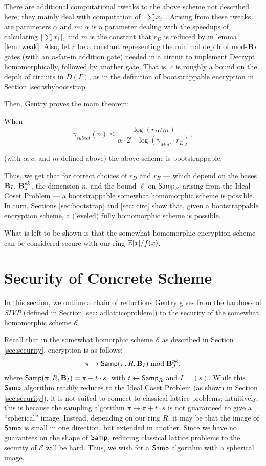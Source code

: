 There are additional computational tweaks to the above scheme not described here; they mainly deal with computation of $\lceil \sum x_i \rfloor$. Arising from these tweaks are parameters $\alpha$ and $m$: $\alpha$ is a parameter dealing with the speedups of calculating $\lceil \sum x_i \rfloor$, and $m$ is the constant that $r_D$ is reduced by in lemma \ref{lem:tweak}. Also, let $c$ be a constant representing the minimal depth of mod-$\textbf{B}_I$ gates (with an $n$-fan-in addition gate) needed in a circuit to implement Decrypt homomorphically, followed by another gate. That is, $c$ is roughly a bound on the depth of circuits in $D(\Gamma)$, as in the definition of bootstrappable encryption in Section \ref{sec:whybootstrap}.

Then, Gentry proves the main theorem:
\begin{theorem}
When
\[\gamma_{subset}(n) \leq \frac{\log(r_D / m)}{\alpha \cdot 2^c \cdot \log(\gamma_{Mult} \cdot r_E)},\]

(with $\alpha, c$, and $m$ defined above) the above scheme is bootstrappable.
\end{theorem}

Thus, we get that for correct choices of $r_D$ and $r_E$ --- which depend on the bases $\textbf{B}_I$, $\textbf{B}_J^{sk}$, the dimension $n$, and the bound $\ell$ on ${\sf Samp}_R$ arising from the Ideal Coset Problem --- a bootstrappable somewhat homomorphic scheme is possible. In turn, Sections \ref{sec:bootstrap} and \ref{sec: circ} show that, given a bootstrappable encryption scheme, a (leveled) fully homomorphic scheme is possible.

What is left to be shown is that the somewhat homomorphic encryption scheme can be considered secure with our ring $\mathbb{Z}[x] / f(x)$.

\section{Security of Concrete Scheme} \label{sec: genthardness}
In this section, we outline a chain of reductions Gentry gives from the hardness of \emph{SIVP} (defined in Section \ref{sec: adlatticeproblem}) to the security of the somewhat homomorphic scheme $\mathcal{E}$.

Recall that in the somewhat homorphic scheme $\mathcal{E}$ as described in Section \ref{sec:security}, encryption is as follows:
\[ \pi \to {\sf Samp}(\pi, R, \textbf{B}_I) \bmod \textbf{B}_J^{pk}, \]
where ${\sf Samp}(\pi, R, \textbf{B}_I) = \pi + t \cdot s$, with $t \leftarrow {\sf Samp}_R$ and $I = (s)$. While this ${\sf Samp}$ algorithm readily reduces to the Ideal Coset Problem (as shown in Section \ref{sec:security}), it is not suited to connect to classical lattice problems; intuitively, this is because the sampling algorithm $\pi \to \pi + t \cdot s$ is not guaranteed to give a ``spherical'' image. Instead, depending on our ring $R$, it may be that the image of ${\sf Samp}$ is small in one direction, but extended in another. Since we have no guarantees on the shape of ${\sf Samp}$, reducing classical lattice problems to the security of $\mathcal{E}$ will be hard. Thus, we wish for a ${\sf Samp}$ algorithm with a spherical image.


